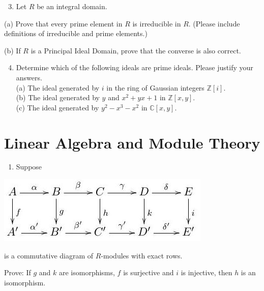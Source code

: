 \documentclass[10pt]{article}
\begin{document}
\begin{enumerate}
  \setcounter{enumi}{2}
  \item Let $R$ be an integral domain.
\end{enumerate}
(a) Prove that every prime element in $R$ is irreducible in $R$. (Please include definitions of irreducible and prime elements.)

(b) If $R$ is a Principal Ideal Domain, prove that the converse is also correct.

\begin{enumerate}
  \setcounter{enumi}{3}
  \item Determine which of the following ideals are prime ideals. Please justify your answers.\\
(a) The ideal generated by $i$ in the ring of Gaussian integers $\mathbb{Z}[i]$.\\
(b) The ideal generated by $y$ and $x^{2}+y x+1$ in $\mathbb{Z}[x, y]$.\\
(c) The ideal generated by $y^{2}-x^{3}-x^{2}$ in $\mathbb{C}[x, y]$.
\end{enumerate}
\section{Linear Algebra and Module Theory}
\begin{enumerate}
  \item Suppose
\end{enumerate}
\includegraphics{2022_05_24_f62df93b9d660067b55fg-10}

is a commutative diagram of $R$-modules with exact rows.

Prove: If $g$ and $k$ are isomorphisms, $f$ is surjective and $i$ is injective, then $h$ is an isomorphism.
\end{document}
